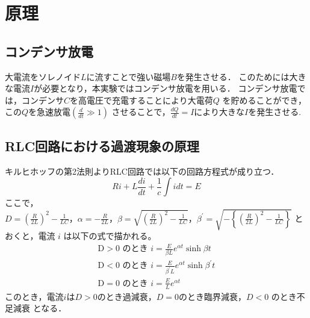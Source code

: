 
\section{原理}

\subsection{コンデンサ放電}
大電流をソレノイド$L$に流すことで強い磁場$B$を発生させる．
このためには大きな電流$I$が必要となり，本実験ではコンデンサ放電を用いる．
コンデンサ放電では，コンデンサ$C$を高電圧で充電することにより大電荷$Q$
を貯めることができ，この$Q$を急速放電$\left(\frac{d}{d t} \gg 1\right)$
させることで，$\frac{d Q}{d t}=I$により大きな$I$を発生させる.

\subsection{RLC回路における過渡現象の原理}
キルヒホッフの第2法則よりRLC回路では以下の回路方程式が成り立つ．
$$
R i+L\frac{di}{dt}+\frac{1}{c} \int i d t=E
$$
ここで，$D=\left(\frac{R}{2 L}\right)^2-\frac{1}{L C}， \alpha=-\frac{R}{2 L} ， \beta=\sqrt{\left(\frac{R}{2 L}\right)^2-\frac{1}{L C}}， \beta^{\prime}=\sqrt{-\left\{\left(\frac{R}{2 L}\right)^2-\frac{1}{L C}\right\}}$
とおくと，電流 $i$ は以下の式で描かれる。
$$
\begin{gathered}
\mathrm{D}>0 \text { のとき } i=\frac{E}{\beta L} e^{\alpha t} \sinh \beta t \\
\mathrm{D}<0 \text { のとき } i=\frac{E}{\beta^{\prime} L} e^{\alpha t} \sinh \beta^{\prime} t \\
\mathrm{D}=0 \text { のとき } i=\frac{E}{L} e^{\alpha t}
\end{gathered}
$$
このとき，電流$i$は$D>0$のとき過減衰，$D=0$のとき臨界減衰，$D<0$ のとき不足減衰
となる．


